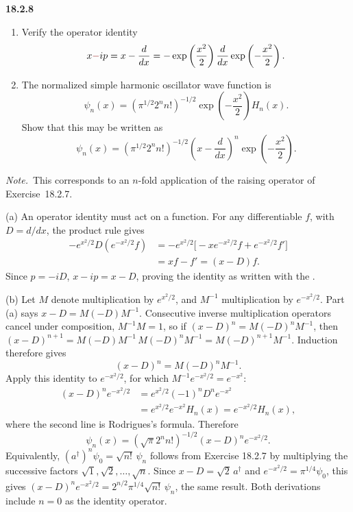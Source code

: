 \par\bigskip
\noindent\textbf{18.2.8}
\begin{enumerate}
\item[(a)] Verify the operator identity
\[
x\erratum{-}ip=x-\frac{d}{dx}
=-\exp\left(\frac{x^{2}}{2}\right)\frac{d}{dx}
\exp\left(-\frac{x^{2}}{2}\right).
\]
\item[(b)] The normalized simple harmonic oscillator wave function is
\[
\psi_{n}(x)=(\pi^{1/2}2^{n}n!)^{-1/2}
\exp\left(-\frac{x^{2}}{2}\right)H_{n}(x).
\]
Show that this may be written as
\[
\psi_{n}(x)=(\pi^{1/2}2^{n}n!)^{-1/2}
\left(x-\frac{d}{dx}\right)^{n}\exp\left(-\frac{x^{2}}{2}\right).
\]
\end{enumerate}
\par\emph{Note.}~This corresponds to an $n$-fold application of the
raising operator of Exercise~18.2.7.
\par\nobreak
\solution
(a) An operator identity must act on a function.  For any differentiable
$f$, with $D=d/dx$, the product rule gives
\begin{align*}
-e^{x^2/2}D(e^{-x^2/2}f)
 &=-e^{x^2/2}\bigl[-xe^{-x^2/2}f+e^{-x^2/2}f'\bigr]\\
 &=xf-f'=(x-D)f.
\end{align*}
Since $p=-iD$, $x-ip=x-D$, proving the identity as written with the
.

(b) Let $M$ denote multiplication by $e^{x^2/2}$, and $M^{-1}$
multiplication by $e^{-x^2/2}$.  Part (a) says
$x-D=M(-D)M^{-1}$.  Consecutive inverse multiplication operators
cancel under composition, $M^{-1}M=1$, so if
$(x-D)^n=M(-D)^nM^{-1}$, then
$(x-D)^{n+1}=M(-D)M^{-1}\,M(-D)^nM^{-1}=M(-D)^{n+1}M^{-1}$.
Induction therefore gives
\[
(x-D)^n=M(-D)^nM^{-1}.
\]
Apply this identity to $e^{-x^2/2}$, for which
$M^{-1}e^{-x^2/2}=e^{-x^2}$:
\begin{align*}
(x-D)^ne^{-x^2/2}
 &=e^{x^2/2}(-1)^nD^ne^{-x^2}\\
 &=e^{x^2/2}e^{-x^2}H_n(x)
 =e^{-x^2/2}H_n(x),
\end{align*}
where the second line is Rodrigues's formula.  Therefore
\[
\boxed{\psi_n(x)=(\sqrt\pi2^nn!)^{-1/2}
       (x-D)^ne^{-x^2/2}}.
\]
Equivalently, $(a^\dagger)^n\psi_0=\sqrt{n!}\,\psi_n$ follows from
Exercise 18.2.7 by multiplying the successive factors
$\sqrt1,\sqrt2,\ldots,\sqrt n$.  Since $x-D=\sqrt2\,a^\dagger$ and
$e^{-x^2/2}=\pi^{1/4}\psi_0$, this gives
$(x-D)^ne^{-x^2/2}=2^{n/2}\pi^{1/4}\sqrt{n!}\,\psi_n$, the same result.
Both derivations include $n=0$ as the identity operator.

